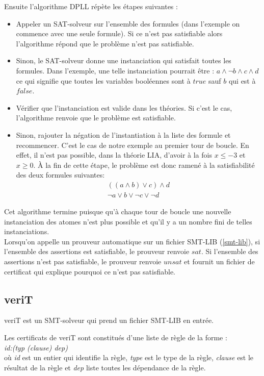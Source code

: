 \documentclass[11pt]{article}
\begin{document}
Ensuite l'algorithme DPLL répète les étapes suivantes :
\begin{itemize}
\item Appeler un SAT-solveur sur l'ensemble des formules (dans l'exemple on commence avec une seule formule). Si ce n'est pas satisfiable alors l'algorithme répond que le problème n'est pas satisfiable.
\item Sinon, le SAT-solveur donne une instanciation qui satisfait toutes les formules. Dans l'exemple, une telle instanciation pourrait être :
  $a \wedge \neg b \wedge c \wedge d$
ce qui signifie que toutes les variables booléennes sont à $true$ sauf $b$ qui est à $false$.
\item Vérifier que l'instanciation est valide dans les théories. Si c'est le cas, l'algorithme renvoie que le problème est satisfiable.
\item Sinon, rajouter la négation de l'instantiation à la liste des formule et recommencer. C'est le cas de notre exemple au premier tour de boucle. En effet, il n'est pas possible, dans la théorie LIA, d'avoir à la fois $x \leq -3$ et $x \geq 0$. À la fin de cette étape, le problème est donc ramené à la satisfiabilité des deux formules suivantes:
  \begin{align*}
    ((a \wedge b) \vee c) \wedge d \\
    \neg a \vee b \vee \neg c \vee \neg d
  \end{align*}


\end{itemize}

Cet algorithme termine puisque qu'à chaque tour de boucle une nouvelle instanciation des atomes n'est plus possible et qu'il y a un nombre fini de telles instanciations. \\

Lorsqu'on appelle un prouveur automatique sur un fichier SMT-LIB (\ref{smt-lib}), si l'ensemble des assertions est satisfiable, le prouveur renvoie $sat$. Si l'ensemble des assertions n'est pas satisfiable, le prouveur renvoie $unsat$ et fournit un fichier de certificat qui explique pourquoi ce n'est pas satisfiable. 

\subsection{veriT}

veriT est un SMT-solveur qui prend un fichier SMT-LIB en entrée. 

Les certificats de veriT sont constitués d'une liste de règle de la forme :\\
\textit{id:(typ (clause) dep)}\\
où \textit{id} est un entier qui identifie la règle, \textit{type} est le type de la règle,
\textit{clause} est le résultat de la règle et \textit{dep} liste toutes les dépendance de la règle. \\
\end{document}
